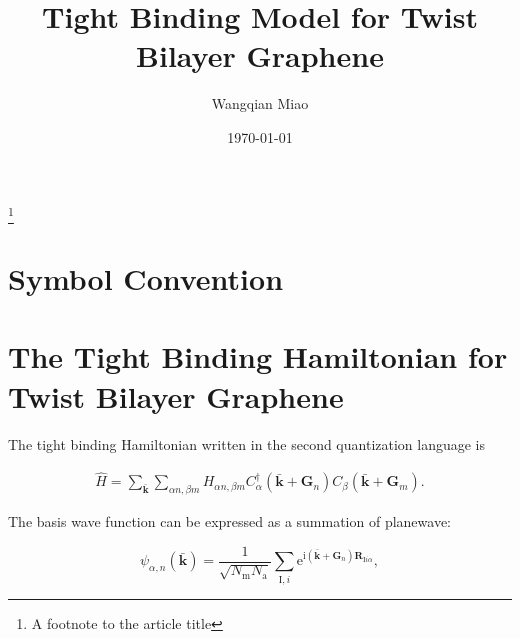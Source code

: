 \documentclass[%
 amsmath,amssymb,
rmp,
]{revtex4-1}
\def \bkbar {\bar{\mathbf{k}}}
\def \bG    {\mathbf{G}}
\def \e     {\mathrm{e}}
\def \I     {\mathrm{I}}
\def \i     {\mathrm{i}}
\def \bR    {\mathbf{R}}
\begin{document}

\title{Tight Binding Model for Twist Bilayer Graphene}%
\thanks{A footnote to the article title}%

\author{Wangqian Miao}

\date{\today}%



\maketitle




\nocite{*}




\section{Symbol Convention}

\section{The Tight Binding Hamiltonian for Twist Bilayer Graphene}

The tight binding Hamiltonian written in the second quantization language is

\begin{equation}
\begin{aligned}
\hat{H} = \sum_{\bkbar} \sum_{\alpha n, \beta m} H_{\alpha n, \beta m} C_{\alpha}^\dagger (\bkbar+ \bG_n)C_{\beta}(\bkbar+\bG_m).
\end{aligned}
\end{equation}

The basis wave function can be expressed as a summation of planewave:

\begin{equation}
\psi_{\alpha, n}(\bkbar) = \frac{1}{\sqrt{N_\mathrm{m} N_\mathrm{a}}}\sum_{\I, i} \e^{\i(\bkbar+\bG_n)\bR_{\I i \alpha}},
\end{equation}
\end{document}
